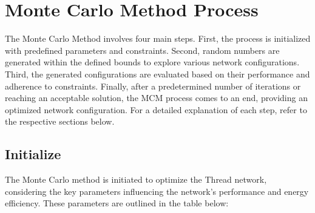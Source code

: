 \section{Monte Carlo Method Process}\label{sec:monte_carlo_method_process}

The Monte Carlo Method involves four main steps. First, the process is initialized with predefined parameters and constraints. Second, random numbers are generated within the defined bounds to explore various network configurations. Third, the generated configurations are evaluated based on their performance and adherence to constraints. Finally, after a predetermined number of iterations or reaching an acceptable solution, the MCM process comes to an end, providing an optimized network configuration. For a detailed explanation of each step, refer to the respective sections below.

\subsection{Initialize}

The Monte Carlo method is initiated to optimize the Thread network, considering the key parameters influencing the network's performance and energy efficiency. These parameters are outlined in the table below:

